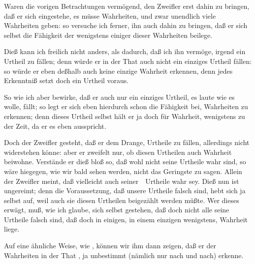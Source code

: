 \begin{aufza}
\item Waren die vorigen Betrachtungen vermögend, den Zweifler erst dahin zu bringen, daß er sich eingestehe, es müsse Wahrheiten, und zwar unendlich viele Wahrheiten geben: so versuche ich ferner, ihn auch dahin zu bringen, daß er sich selbst die Fähigkeit der  wenigstens einiger dieser Wahrheiten beilege.
\item Dieß kann ich freilich nicht anders, als dadurch, daß ich ihn vermöge, irgend ein Urtheil zu fällen; denn würde er in der That auch nicht ein einziges Urtheil fällen: so würde er eben deßhalb auch keine einzige Wahrheit erkennen, denn jedes Erkenntniß setzt doch ein Urtheil voraus.
\item So wie ich aber bewirke, daß er auch nur ein einziges Urtheil, es laute wie es wolle, fällt; so legt er sich eben hierdurch schon die Fähigkeit bei, Wahrheiten zu erkennen; denn dieses Urtheil selbst hält er ja doch für Wahrheit, wenigstens zu der Zeit, da er es eben ausspricht.
\item Doch der Zweifler gesteht, daß er dem Drange, Urtheile zu fällen, allerdings nicht widerstehen könne: aber er zweifelt nur, ob diesen Urtheilen auch Wahrheit beiwohne. Verstände er dieß bloß so, daß wohl nicht  seine Urtheile wahr sind, so wäre hiegegen, wie wir bald sehen werden, nicht das Geringste zu sagen. Allein der Zweifler meint, daß vielleicht auch  seiner~\ Urtheile wahr sey. Dieß nun ist ungereimt; denn die Voraussetzung, daß  unsere Urtheile falsch sind, hebt sich ja selbst auf, weil auch sie diesen Urtheilen beigezählt werden müßte. Wer dieses erwägt, muß, wie ich glaube, sich selbst gestehen, daß doch nicht alle seine Urtheile falsch sind, daß doch in einigen, in einem einzigen wenigstens, Wahrheit liege. 
\item Auf eine ähnliche Weise, wie , können wir ihm dann zeigen, daß er der Wahrheiten in der That , ja unbestimmt  (nämlich nur nach und nach) erkenne.
\end{aufza}

